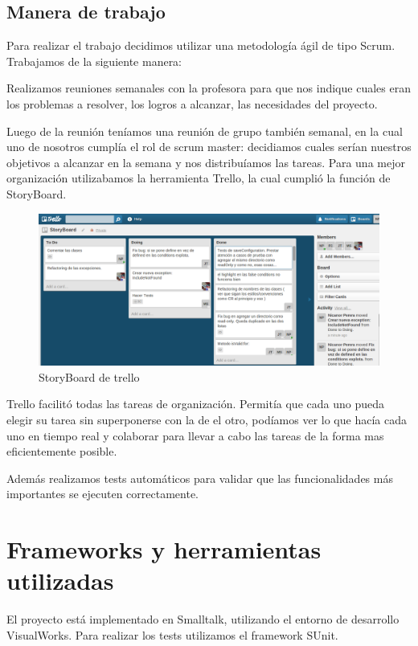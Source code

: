 \documentclass[a4paper,oneside,12pt]{article}
\begin{document}
\subsection{Manera de trabajo}

Para realizar el trabajo decidimos utilizar una metodología \'agil de tipo Scrum. Trabajamos de la siguiente manera: 

Realizamos reuniones semanales con la profesora para que nos indique cuales eran los problemas a resolver, los logros a alcanzar, las necesidades del proyecto.

Luego de la reunión teníamos una reunión de grupo también semanal, en la cual uno de nosotros cumplía el rol de scrum master: decidiamos cuales serían nuestros objetivos a alcanzar en la semana y nos distribuíamos las tareas. Para una mejor organización utilizabamos la herramienta Trello, la cual cumplió la función de StoryBoard.

\begin{figure}[h!]
  \centering
    \includegraphics[scale=0.27]{images/trello.png}
    \caption{StoryBoard de trello}
\end{figure}

Trello facilitó todas las tareas de organización. Permitía que cada uno pueda elegir su tarea sin superponerse con la de el otro, podíamos ver lo que hacía cada uno en tiempo real y colaborar para llevar a cabo las tareas de la forma mas eficientemente posible. 

Adem\'as realizamos tests autom\'aticos para validar que las funcionalidades m\'as importantes se ejecuten correctamente.

\section{Frameworks y herramientas utilizadas}
El proyecto est\'a implementado en Smalltalk, utilizando el entorno de desarrollo VisualWorks. Para realizar los tests utilizamos el framework SUnit.
\end{document}
